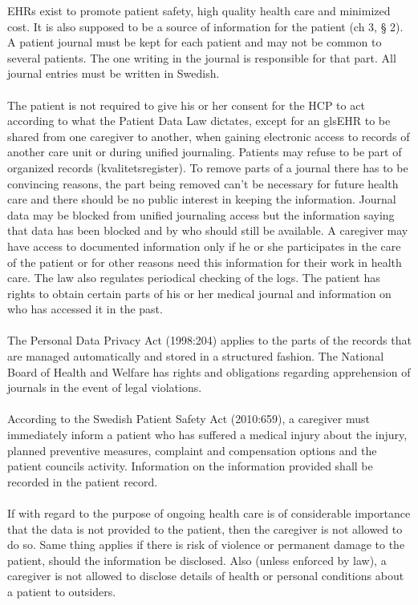 \documentclass[14pt]{article}
\begin{document}
\glspl{EHR} exist to promote patient safety, high quality health care and minimized cost. It is also supposed to be a source of information for the patient (ch 3, § 2). A patient journal must be kept for each patient and may not be common to several patients. The one writing in the journal is responsible for that part. All journal entries must be written in Swedish. \cite{PatientDataAct}
\\\\
The patient is not required to give his or her consent for the \gls{HCP} to act according to what the Patient Data Law dictates, except for an gls{EHR} to be shared from one caregiver to another, when gaining electronic access to records of another care unit or during unified journaling. Patients may refuse to be part of organized records (kvalitetsregister). To remove parts of a journal there has to be convincing reasons, the part being removed can't be necessary for future health care and there should be no public interest in keeping the information. Journal data may be blocked from unified journaling access but the information saying that data has been blocked and by who should still be available. A caregiver may have access to documented information only if he or she participates in the care of the patient or for other reasons need this information for their work in health care. The law also regulates periodical checking of the logs. The patient has rights to obtain certain parts of his or her medical journal and information on who has accessed it in the past.\cite{PatientDataAct}
\\\\
The Personal Data Privacy Act (1998:204) applies to the parts of the records that are managed automatically and stored in a structured fashion. The National Board of Health and Welfare has rights and obligations regarding apprehension of journals in the event of legal violations.\cite{PatientDataAct}
\\\\
According to the Swedish Patient Safety Act (2010:659), a caregiver must immediately inform a patient who has suffered a medical injury
about the injury, planned preventive measures, complaint and compensation
options and the patient councils activity. Information on the information provided shall be recorded in the patient record.\cite{PatientSafetyAct}
\\\\
If with regard to the purpose of ongoing health care is of considerable importance
that the data is not provided to the patient, then the caregiver is not allowed to
do so. Same thing applies if there is risk of violence or permanent damage to the
patient, should the information be disclosed. Also (unless enforced by law), a caregiver is not allowed to disclose details of health or personal conditions about a patient to outsiders.\cite{PatientSafetyAct}
\end{document}
